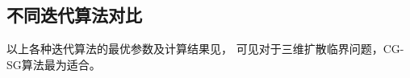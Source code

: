 \begin{comment}
res_gmres_size1_*restart15
1 & 600.929 & 19030 & 19030 \\ %
2 & 600.960 & 26496 & 13248 \\ %
3 & 600.944 & 29478 & 9826 \\ %
4 & 600.944 & 30732 & 7683 \\ %
5-22 & \multicolumn{3}{c}{不收敛} \\ %
23 & 601.194 & 24242 & 1054 \\ %
24 & 601.350 & 24192 & 1008 \\ %
25 & 169.182 & 6700 & 268\\
26 & 160.555 & 6292 & 242\\
27 & 161.804 & 6264 & 232\\
28 & 166.328 & 6412 & 229\\
29 & 175.844 & 6612 & 228\\
30 & 188.386 & 6930 & 231\\

\end{comment}

\subsection{不同迭代算法对比}

以上各种迭代算法的最优参数及计算结果见，
可见对于三维扩散临界问题，CG-SG算法最为适合。


